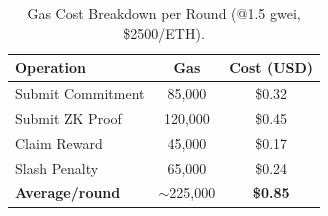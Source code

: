 
\begin{table}[t]
\centering
\caption{Gas Cost Breakdown per Round (@1.5 gwei, \$2500/ETH).}
\label{tab:gas_breakdown}
\small
\begin{tabular}{l|cc}
\toprule
\textbf{Operation} & \textbf{Gas} & \textbf{Cost (USD)} \\
\midrule
Submit Commitment & 85,000 & \$0.32 \\
Submit ZK Proof & 120,000 & \$0.45 \\
Claim Reward & 45,000 & \$0.17 \\
Slash Penalty & 65,000 & \$0.24 \\
\midrule
\textbf{Average/round} & $\sim$225,000 & \textbf{\$0.85} \\
\bottomrule
\end{tabular}
\end{table}
